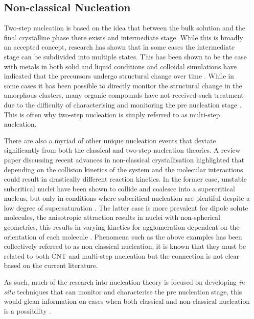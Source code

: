 \subsection{Non-classical Nucleation} 
Two-step nucleation is based on the idea that between
the bulk solution and the final crystalline phase there
exists and intermediate stage. While this is broadly an
accepted concept, research has shown that in some cases
the intermediate stage can be subdivided into multiple 
states. This has been shown to be the case with metals
in both solid and liquid conditions \cite{Cao2020, Ye2023}
and colloidal simulations have indicated that the 
precursors undergo structural change over time \cite{Tan2013}. 
While in some cases it has been possible to directly
monitor the structural change in the amorphous clusters, 
many organic compounds have not received such treatment
due to the difficulty of characterising and monitoring 
the pre nucleation stage \cite{Fu2021}. This is often 
why two-step nucleation is simply referred to as 
multi-step nucleation. 

There are also a myriad of other unique nucleation events
that deviate significantly from both the classical and 
two-step nucleation theories. A review paper discussing
recent advances in non-classical crystallisation highlighted
that depending on the collision kinetics of the system 
and the molecular interactions could result in drastically
different reaction kinetics. In the former case, unstable
subcritical nuclei have been shown to collide and coalesce
into a supercritical nucleus, but only in conditions where 
subcritical nucleation are plentiful despite a low degree
of supersaturation \cite{Baumgartner2013}. The latter case 
is more prevalent for dipole solute molecules, the anisotropic 
attraction results in nuclei with non-spherical geometries, 
this results in varying kinetics for agglomeration dependent 
on the orientation of each molecule \cite{Yau2001}. Phenomena 
such as the above examples has been collectively refereed to 
as non classical nucleation, it is known that they must be 
related to both CNT and multi-step nucleation but the connection 
is not clear based on the current literature.  

As such, much of the research into nucleation theory is 
focused on developing \textit{in situ} techniques that can 
monitor and characterise the pre nucleation stage, this
would glean information on cases when both classical 
and non-classical nucleation is a possibility 
\cite{Karthika2016}. 

